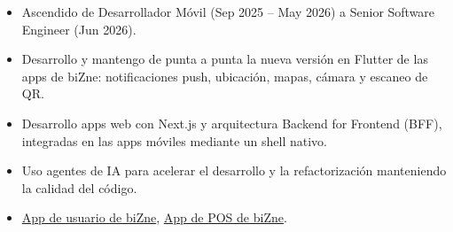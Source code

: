 \documentclass[9pt,a4paper]{altacv}
\begin{document}





\begin{fullwidth}
	\makecvheader
\end{fullwidth}




\begin{itemize}
	\item Ascendido de Desarrollador Móvil (Sep 2025 -- May 2026) a Senior Software Engineer (Jun 2026).
	\item Desarrollo y mantengo de punta a punta la nueva versión en Flutter de las apps de biZne: notificaciones push, ubicación, mapas, cámara y escaneo de QR.
	\item Desarrollo apps web con Next.js y arquitectura Backend for Frontend (BFF), integradas en las apps móviles mediante un shell nativo.
	\item Uso agentes de IA para acelerar el desarrollo y la refactorización manteniendo la calidad del código.
	\item \href{https://play.google.com/store/apps/details?id=mx.devbizne.bizne&hl=en-US}{App de usuario de biZne},
	      \href{https://play.google.com/store/apps/details?id=mx.bizne.kitchen&hl=en-US}{App de POS de biZne}.
\end{itemize}
\end{document}
